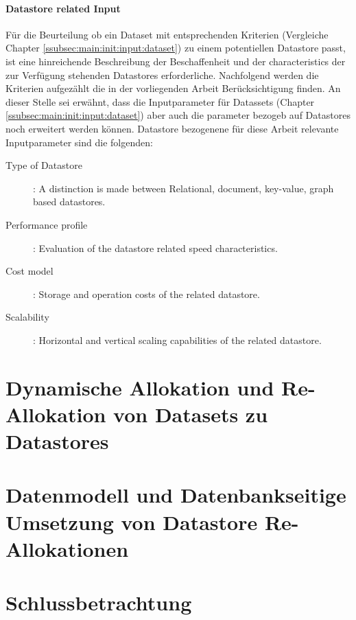 \subsubsection{Datastore related Input}
\label{ssubsec:main:init:input:datastore}
Für die Beurteilung ob ein Dataset mit entsprechenden Kriterien (Vergleiche Chapter \ref{ssubsec:main:init:input:dataset})
zu einem potentiellen Datastore passt, ist eine hinreichende Beschreibung der Beschaffenheit und der characteristics
der zur Verfügung stehenden Datastores erforderliche. Nachfolgend werden die Kriterien aufgezählt die in der 
vorliegenden Arbeit Berücksichtigung finden. An dieser Stelle sei erwähnt, dass die Inputparameter für 
Datassets (Chapter \ref{ssubsec:main:init:input:dataset}) aber auch die parameter bezogeb auf Datastores
noch erweitert werden können.
Datastore bezogenene für diese Arbeit relevante Inputparameter sind die folgenden:
\begin{description}
    \item[Type of Datastore]: A distinction is made between Relational, document, key-value, graph based datastores.
    \item[Performance profile]: Evaluation of the datastore related speed characteristics.
    \item[Cost model]: Storage and operation costs of the related datastore.
    \item[Scalability]: Horizontal and vertical scaling capabilities of the related datastore.   
\end{description}





\chapter{Dynamische Allokation und Re-Allokation von Datasets zu Datastores}



\chapter{Datenmodell und Datenbankseitige Umsetzung von Datastore Re-Allokationen}


\chapter{Schlussbetrachtung}